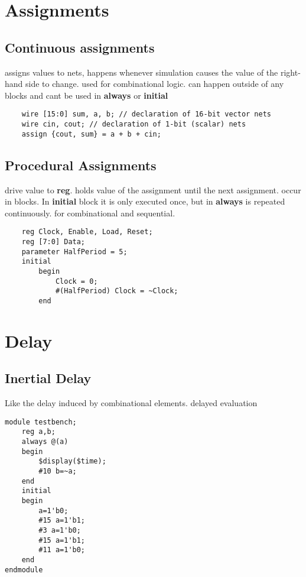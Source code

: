 \section{Assignments}
\subsection{Continuous assignments}
assigns values to nets, happens whenever simulation causes the value of the right-hand side to change. used for combinational logic. can happen outside of any blocks and cant be used in \textbf{always} or \textbf{initial}

\begin{lstlisting}
    wire [15:0] sum, a, b; // declaration of 16-bit vector nets
    wire cin, cout; // declaration of 1-bit (scalar) nets
    assign {cout, sum} = a + b + cin;
\end{lstlisting}

\subsection{Procedural Assignments}
drive value to \textbf{reg}. holds value of the assignment until the next assignment. occur in blocks. In \textbf{initial} block it is only executed once, but in \textbf{always} is repeated continuously. for combinational and sequential.

\begin{lstlisting}
    reg Clock, Enable, Load, Reset;
    reg [7:0] Data;
    parameter HalfPeriod = 5;
    initial
        begin 
            Clock = 0;
            #(HalfPeriod) Clock = ~Clock;
        end
\end{lstlisting}

\section{Delay}
\subsection{Inertial Delay}
Like the delay induced by combinational elements. delayed evaluation
\begin{lstlisting}
module testbench;
    reg a,b;
    always @(a)
    begin
        $display($time);
        #10 b=~a;
    end
    initial
    begin
        a=1'b0;
        #15 a=1'b1;
        #3 a=1'b0;
        #15 a=1'b1;
        #11 a=1'b0;
    end
endmodule
\end{lstlisting}

